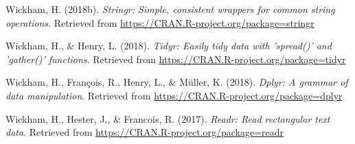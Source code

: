 \documentclass[man]{apa6}
\begin{document}
\hypertarget{ref-R-stringr}{}
Wickham, H. (2018b). \emph{Stringr: Simple, consistent wrappers for
common string operations}. Retrieved from
\url{https://CRAN.R-project.org/package=stringr}

\hypertarget{ref-R-tidyr}{}
Wickham, H., \& Henry, L. (2018). \emph{Tidyr: Easily tidy data with
'spread()' and 'gather()' functions}. Retrieved from
\url{https://CRAN.R-project.org/package=tidyr}

\hypertarget{ref-R-dplyr}{}
Wickham, H., François, R., Henry, L., \& Müller, K. (2018). \emph{Dplyr:
A grammar of data manipulation}. Retrieved from
\url{https://CRAN.R-project.org/package=dplyr}

\hypertarget{ref-R-readr}{}
Wickham, H., Hester, J., \& Francois, R. (2017). \emph{Readr: Read
rectangular text data}. Retrieved from
\url{https://CRAN.R-project.org/package=readr}

\endgroup
\end{document}
